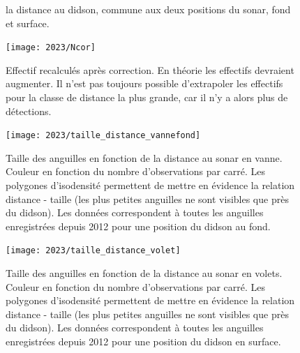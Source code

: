 \documentclass[11pt,twocolumn,titlepage,twoside]{article}
\begin{document}
\begin{landscape}
\begin{figure}[htbp]
{  la distance au didson, commune aux deux positions du sonar, fond et surface.}
  \label{efficacite}
\end{figure}
\begin{figure}[htbp]
  \centering
  \texttt{[image: 2023/Ncor]}
  \caption[Effectifs recalculés]{Effectif recalculés après correction. En
  théorie les effectifs devraient augmenter. Il n'est pas toujours possible
  d'extrapoler les effectifs pour la classe de distance la plus grande, car il
  n'y a alors plus de détections.}
  \label{Ncor}
\end{figure}
\end{landscape}
\begin{figure}[htbp]
  \centering
  \texttt{[image: 2023/taille\_distance\_vannefond]}
  \caption[Taille des anguilles vanne]{Taille des anguilles en fonction de la
  distance au sonar en vanne. Couleur en fonction du nombre d'observations par
  carré.
  Les polygones d'isodensité permettent de mettre en évidence la relation
  distance - taille (les plus petites anguilles ne sont visibles que près du
  didson). Les données correspondent à toutes les anguilles enregistrées depuis
  2012 pour une position du didson au fond.}
  \label{taille_distance_vannefond}
\end{figure}
\begin{figure}[htbp]
  \centering
  \texttt{[image: 2023/taille\_distance\_volet]}
  \caption[Taille des anguilles vanne]{Taille des anguilles en fonction de la
  distance au sonar en volets. Couleur en fonction du nombre d'observations par
  carré.
  Les polygones d'isodensité permettent de mettre en évidence la relation
  distance - taille (les plus petites anguilles ne sont visibles que près du
  didson). Les données correspondent à toutes les anguilles enregistrées depuis
  2012 pour une position du didson en surface.}
  \label{taille_distance_volet}
\end{figure}

\twocolumn   
\end{document}
